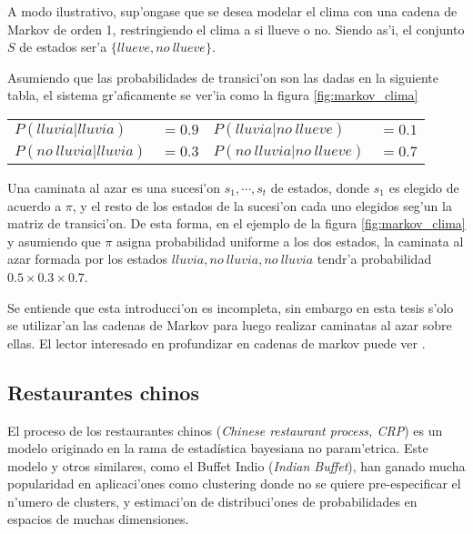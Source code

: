 A modo ilustrativo, sup'ongase que se desea modelar el clima con una cadena de Markov de orden 1, restringiendo el clima a si llueve o no. Siendo as'i, el conjunto 
$S$ de estados ser'a $\{llueve, no\ llueve\}$. 

Asumiendo que las probabilidades de transici'on son las dadas en la siguiente tabla, el sistema gr'aficamente se ver'ia como la figura \ref{fig:markov_clima}

\begin{center}
\label{tabla_markov}
\begin{tabular}{l l l l}
$P(lluvia | lluvia) $ & $=0.9$ & $P(lluvia | no\ llueve) $& $=0.1$\\
$P(no\ lluvia | lluvia)  $ & $=0.3$ & $P(no\ lluvia | no\ llueve) $ & $=0.7$\\
\end{tabular}
\end{center}

\begin{imagen}
    \width{5cm}
\end{imagen}

Una caminata al azar es una sucesi'on $s_1, \cdots, s_t$ de estados, donde $s_1$ es elegido de acuerdo a $\pi$, 
y el resto de los estados de la sucesi'on cada uno elegidos seg'un la matriz de transici'on. De esta forma, en el ejemplo de la figura \ref{fig:markov_clima} y asumiendo 
que $\pi$ asigna probabilidad uniforme a los dos estados, la caminata al azar formada por los estados $lluvia, no\ lluvia, no\ lluvia$ tendr'a probabilidad $0.5\times0.3\times0.7$. 

Se entiende que esta introducci'on es incompleta, sin embargo en esta tesis s'olo se utilizar'an las cadenas de Markov para luego realizar 
caminatas al azar sobre ellas. El lector interesado en profundizar en cadenas de markov puede ver \cite{Rabiner90}.


\subsection{Restaurantes chinos}
El proceso de los restaurantes chinos (\emph{Chinese restaurant process, CRP}) es un modelo originado en la rama de estad\'istica bayesiana no param'etrica.
Este modelo y otros similares, como el Buffet Indio (\emph{Indian Buffet}), han ganado mucha popularidad en aplicaci'ones como clustering donde no se quiere
pre-especificar el n'umero de clusters, y estimaci'on de distribuci'ones de probabilidades en espacios de muchas dimensiones.

